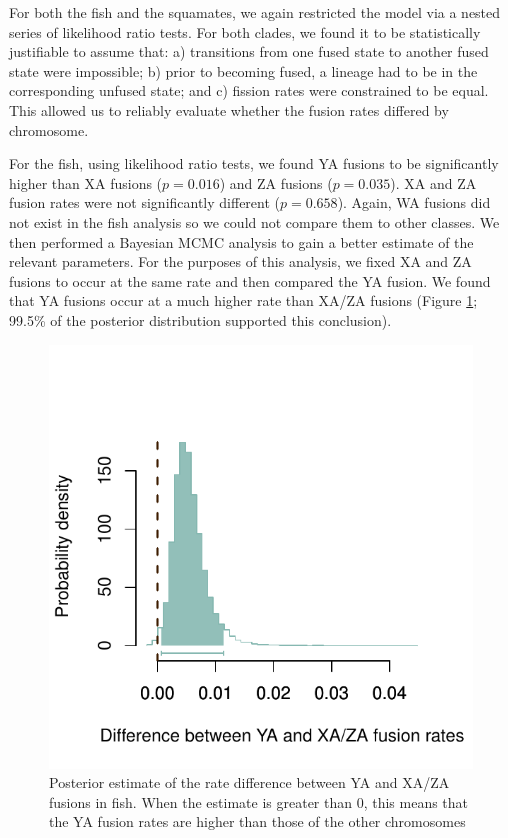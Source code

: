 \documentclass[12pt,twoside]{article}
\begin{document}
For both the fish and the squamates, we again restricted the model via a nested series of likelihood ratio tests. For both clades, we found it to be statistically justifiable to assume that: a) transitions from one fused state to another fused state were impossible; b) prior to becoming fused, a lineage had to be in the corresponding unfused state; and c) fission rates were constrained to be equal. This allowed us to reliably evaluate whether the fusion rates differed by chromosome.

For the fish, using likelihood ratio tests, we found YA fusions to be significantly higher than XA fusions ($p=\text{0.016}$) and ZA fusions ($p=\text{0.035}$). XA and ZA fusion rates were not significantly different ($p=\text{0.658}$). Again, WA fusions did not exist in the fish analysis so we could not compare them to other classes. We then performed a Bayesian MCMC analysis to gain a better estimate of the relevant parameters. For the purposes of this analysis, we fixed XA and ZA fusions to occur at the same rate and then compared the YA fusion. We found that YA fusions occur at a much higher rate than XA/ZA fusions (Figure \ref{fig:fish-ind}; 99.5\% of the posterior distribution supported this conclusion).

\begin{figure}[p]
\centering
\includegraphics[scale=1.25]{figs/chromosome-fusion-fish}
\caption{Posterior estimate of the rate difference between YA and XA/ZA fusions in fish. When the estimate is greater than 0, this means that the YA fusion rates are higher than those of the other chromosomes}
\label{fig:fish-ind}
\end{figure}
\end{document}
